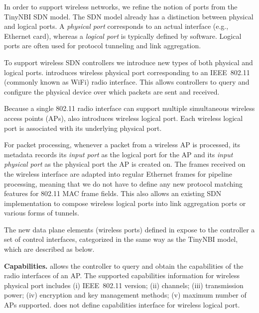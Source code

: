 In order to support wireless networks, we refine the notion of ports from
the TinyNBI SDN model. The SDN model already has a distinction between
physical and logical ports. A \emph{physical port} corresponds to an actual
interface (e.g., Ethernet card), whereas a \emph{logical port} is typically
defined by software. Logical ports are often used for protocol
tunneling and link aggregation.

To support wireless SDN controllers we introduce new types of both physical
and logical ports. \aetherflow introduces wireless physical port
corresponding to an IEEE~802.11 (commonly known as WiFi) radio interface.
This allows controllers to query and configure the physical device over
which packets are sent and received.

Because a single 802.11 radio interface can support multiple simultaneous
wireless access points (APs), \aetherflow also introduces wireless
logical port. Each wireless logical port is associated with its underlying
physical port.

For packet processing, whenever a packet from a wireless AP is
processed, its metadata records its \emph{input port} as the logical port
for the AP and its \emph{input physical port} as the physical port the AP is
created on. The frames received on
the wireless interface are adapted into regular Ethernet frames for pipeline
processing, meaning that we
do not have to define any new protocol matching features for 802.11 MAC frame
fields. This also allows an existing SDN implementation to compose
wireless logical ports into link aggregation ports or various forms of
tunnels.
% 

The new data plane elements (wireless ports) defined in \aetherflow expose to
the controller a set of control interfaces, categorized in the same way as the
TinyNBI model, which are described as below.

\textbf{Capabilities.}
\aetherflow allows the controller to query and obtain the capabilities of the
radio interfaces of an AP. The supported capabilities information for wireless
physical port includes 
    (i) IEEE~802.11 version; 
    (ii) channels; 
    (iii) transmission power; 
    (iv) encryption and key management methods; 
    (v) maximum number of APs supported.
\aetherflow does not define capabilities interface for wireless logical port.


